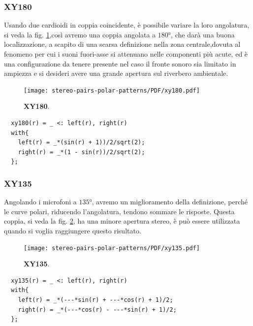 \subsubsection*{XY180}
Usando due cardioidi in coppia coincidente, è possibile variare la loro
angolatura, si veda la fig. \ref{xy180},così avremo una coppia angolata a $180°$,
che darà una buona localizzazione, a scapito di una scarsa definizione
nella zona centrale,dovuta al fenomeno per cui i suoni fuori-asse si attenuano
nelle componenti più acute, ed è una configurazione da tenere presente nel caso
il fronte sonoro sia limitato in ampiezza e si desideri avere una grande apertura
sul riverbero ambientale.
\begin{figure}[h]
\begin{center}
\texttt{[image: stereo-pairs-polar-patterns/PDF/xy180.pdf]}
\caption{\textbf{XY180}.}
\label{xy180}
\end{center}
\end{figure}
\begin{lstlisting}
  xy180(r) = _ <: left(r), right(r)
  with{
    left(r) = _*(sin(r) + 1))/2/sqrt(2);
    right(r) = _*(1 - sin(r))/2/sqrt(2);
  };
\end{lstlisting}
\subsubsection*{XY135}
Angolando i microfoni a $135°$, avremo un miglioramento
della definizione, perché le curve polari, riducendo l’angolatura, tendono
sommare le risposte. Questa coppia, si veda la fig. \ref{xy135}, ha una minore
apertura stereo, è può essere utilizzata quando si voglia raggiungere
questo risultato.
\begin{figure}[h]
\begin{center}
\texttt{[image: stereo-pairs-polar-patterns/PDF/xy135.pdf]}
\caption{\textbf{XY135}.}
\label{xy135}
\end{center}
\end{figure}
\begin{lstlisting}
  xy135(r) = _ <: left(r), right(r)
  with{
    left(r) = _*(---*sin(r) + ---*cos(r) + 1)/2;
    right(r) = _*(---*cos(r) - ---*sin(r) + 1)/2;
  };
\end{lstlisting}
